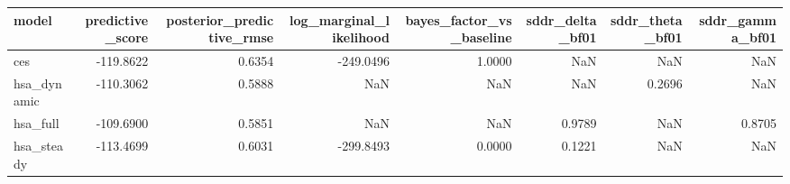 \begin{tabular}{lrrrrrrr}
\toprule
model & predictive\_score & posterior\_predictive\_rmse & log\_marginal\_likelihood & bayes\_factor\_vs\_baseline & sddr\_delta\_bf01 & sddr\_theta\_bf01 & sddr\_gamma\_bf01 \\
\midrule
ces & -119.8622 & 0.6354 & -249.0496 & 1.0000 & NaN & NaN & NaN \\
hsa\_dynamic & -110.3062 & 0.5888 & NaN & NaN & NaN & 0.2696 & NaN \\
hsa\_full & -109.6900 & 0.5851 & NaN & NaN & 0.9789 & NaN & 0.8705 \\
hsa\_steady & -113.4699 & 0.6031 & -299.8493 & 0.0000 & 0.1221 & NaN & NaN \\
\bottomrule
\end{tabular}
